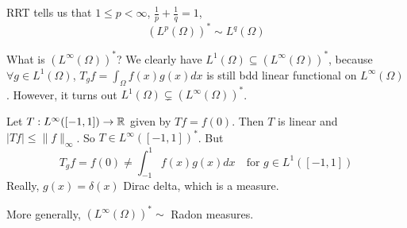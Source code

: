 \begin{rem}
    RRT tells us that $1 \leq p < \infty$, $\frac{1}{p} + \frac{1}{q} = 1$, 
    \[
        (L^p(\Omega))^* \sim L^q(\Omega)
    \]
\end{rem}

\begin{goal}[question]
    What is $(L^\infty(\Omega))^*$? We clearly have $L^1(\Omega) \subseteq (L^\infty(\Omega))^*$,
    because $\forall g \in L^1(\Omega)$, $T_g f = \int_{\Omega} f(x) g(x) dx$ is still
    bdd linear functional on $L^\infty(\Omega)$. However, it turns out $L^1(\Omega) 
    \subsetneq (L^\infty(\Omega))^*$.   
\end{goal}

\begin{exmp}
    Let $T : L^\infty([-1, 1]) \to \mathbb{R}$ given by $T f = f(0)$.
    Then $T$ is linear and $\left| T f \right| \leq \| f \|_{\infty}$. 
    So $T \in L^\infty([-1, 1])^*$. But 
    \[
        T_g f = f(0) \neq \int_{-1}^{1} f(x) g(x) dx \quad \text{for } g \in L^1([-1, 1])
     \]       
    Really, $g(x) = \delta(x)$ Dirac delta, which is a measure. 

    More generally, $(L^\infty(\Omega))^* \sim $ Radon measures. 
\end{exmp}

